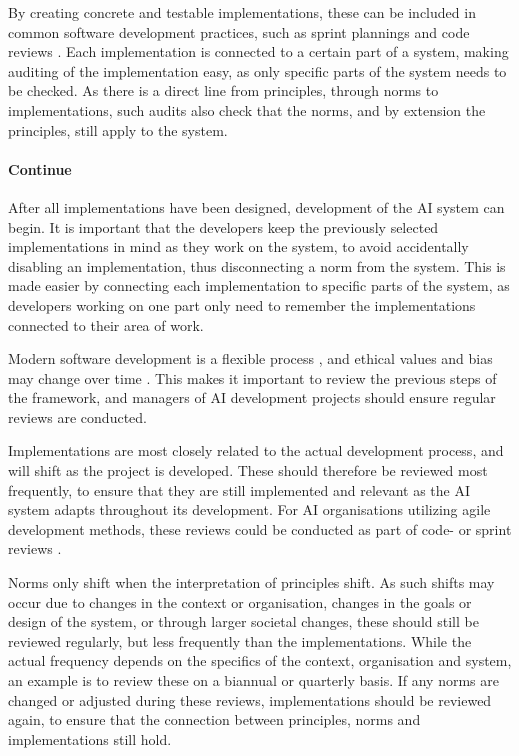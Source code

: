 By creating concrete and testable implementations, these can be included in common software development practices, such as sprint plannings and code reviews \parencite{Dybå_2008_agile}. Each implementation is connected to a certain part of a system, making auditing of the implementation easy, as only specific parts of the system needs to be checked. As there is a direct line from principles, through norms to implementations, such audits also check that the norms, and by extension the principles, still apply to the system.


\paragraph{Continue}
After all implementations have been designed, development of the AI system can begin. It is important that the developers keep the previously selected implementations in mind as they work on the system, to avoid accidentally disabling an implementation, thus disconnecting a norm from the system. This is made easier by connecting each implementation to specific parts of the system, as developers working on one part only need to remember the implementations connected to their area of work.

Modern software development is a flexible process \parencite{Dybå_2008_agile}, and ethical values and bias may change over time \parencite{Nauck_2019}. This makes it important to review the previous steps of the framework, and managers of AI development projects should ensure regular reviews are conducted.

Implementations are most closely related to the actual development process, and will shift as the project is developed. These should therefore be reviewed most frequently, to ensure that they are still implemented and relevant as the AI system adapts throughout its development. For AI organisations utilizing agile development methods, these reviews could be conducted as part of code- or sprint reviews \parencite{Dybå_2008_agile}.

Norms only shift when the interpretation of principles shift. As such shifts may occur due to changes in the context or organisation, changes in the goals or design of the system, or through larger societal changes, these should still be reviewed regularly, but less frequently than the implementations. While the actual frequency depends on the specifics of the context, organisation and system, an example is to review these on a biannual or quarterly basis. If any norms are changed or adjusted during these reviews, implementations should be reviewed again, to ensure that the connection between principles, norms and implementations still hold.

